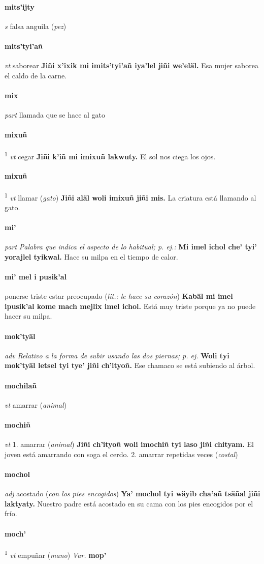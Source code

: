 \documentclass{scrbook}
\newcommand{\entry}[1]{\paragraph{#1}}
\newcommand{\onedefinition}[1]{#1.}
\newcommand{\defsuperscript}[1]{\textsuperscript{1}}
\newcommand{\nontranslationdef}[1]{\textit{#1}}
\newcommand{\partofspeech}[1]{\textit{#1}}
\newcommand{\spanishtranslation}[1]{#1}
\newcommand{\clarification}[1]{(\textit{#1})}
\newcommand{\cholexample}[1]{\textbf{#1}}
\newcommand{\exampletranslation}[1]{#1}
\newcommand{\variation}[1]{\textit{Var.} \textbf{#1}}
\begin{document}
\begin{multicols}{2}
\entry{mits'ijty}
\partofspeech{s}
\spanishtranslation{falsa anguila}
\clarification{pez}

\entry{mits'tyi'añ}
\partofspeech{vt}
\spanishtranslation{saborear}
\cholexample{Jiñi x'ixik mi imits'tyi'añ iya'lel jiñi we'eläl.}
\exampletranslation{Esa mujer saborea el caldo de la carne.}

\entry{mix}
\partofspeech{part}
\spanishtranslation{llamada que se hace al gato}

\entry{mixuñ}
\defsuperscript{1}
\partofspeech{vt}
\spanishtranslation{cegar}
\cholexample{Jiñi k'iñ mi imixuñ lakwuty.}
\exampletranslation{El sol nos ciega los ojos.}

\entry{mixuñ}
\defsuperscript{2}
\partofspeech{vt}
\spanishtranslation{llamar}
\clarification{gato}
\cholexample{Jiñi aläl woli imixuñ jiñi mis.}
\exampletranslation{La criatura está llamando al gato.}

\entry{mi'}
\partofspeech{part}
\nontranslationdef{Palabra que indica el aspecto de lo habitual; p. ej.:}
\cholexample{Mi imel ichol che' tyi' yorajlel tyikwal.}
\exampletranslation{Hace su milpa en el tiempo de calor.}

\entry{mi' mel i pusik'al}
\spanishtranslation{ponerse triste}
\spanishtranslation{estar preocupado}
\clarification{lit.: le hace su corazón}
\cholexample{Kabäl mi imel ipusik'al kome mach mejlix imel ichol.}
\exampletranslation{Está muy triste porque ya no puede hacer su milpa.}

\entry{mok'tyäl}
\partofspeech{adv}
\nontranslationdef{Relativo a la forma de subir usando las dos piernas; p. ej.}
\cholexample{Woli tyi mok'tyäl letsel tyi tye' jiñi ch'ityoñ.}
\exampletranslation{Ese chamaco se está subiendo al árbol.}

\entry{mochilañ}
\partofspeech{vt}
\spanishtranslation{amarrar}
\clarification{animal}

\entry{mochiñ}
\partofspeech{vt}
\onedefinition{1}
\spanishtranslation{amarrar}
\clarification{animal}
\cholexample{Jiñi ch'ityoñ woli imochiñ tyi laso jiñi chityam.}
\exampletranslation{El joven está amarrando con soga el cerdo.}
\onedefinition{2}
\spanishtranslation{amarrar repetidas veces}
\clarification{costal}

\entry{mochol}
\partofspeech{adj}
\spanishtranslation{acostado}
\clarification{con los pies encogidos}
\cholexample{Ya' mochol tyi wäyib cha'añ tsäñal jiñi laktyaty.}
\exampletranslation{Nuestro padre está acostado en su cama con los pies encogidos por el frío.}

\entry{moch'}
\defsuperscript{1}
\partofspeech{vt}
\spanishtranslation{empuñar}
\clarification{mano}
\variation{mop'}


\end{multicols}
\end{document}
